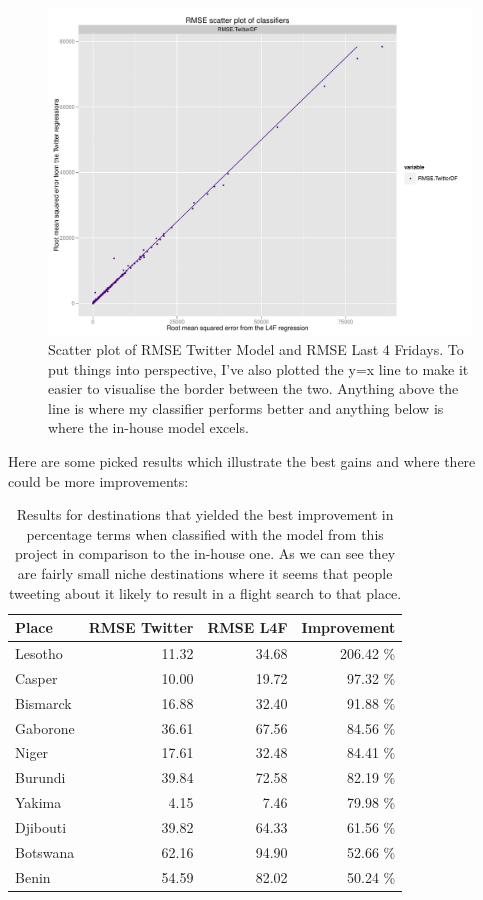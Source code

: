 \documentclass[minf,frontabs,twoside,singlespacing,parskip]{infthesis}
\begin{document}
\begin{figure}[h]
\begin{center}
\includegraphics[scale=0.5]{RMSE}
\end{center}
\caption{Scatter plot of RMSE Twitter Model and RMSE Last 4 Fridays. To put things into perspective, I've also plotted the y=x line to make it easier to visualise the border between the two. Anything above the line is where my classifier performs better and anything below is where the in-house model excels.  }
\end{figure}

Here are some picked results which illustrate the best gains and where there could be more improvements:

\begin{table}[h]
\begin{center}
\begin{tabular}{ l | r | r | r}
Place & RMSE Twitter & RMSE L4F & Improvement \\
\hline
Lesotho & 11.32 & 34.68 & 206.42 \% \\ 
Casper & 10.00 & 19.72 & 97.32 \% \\ 
Bismarck & 16.88 & 32.40 & 91.88 \% \\ 
Gaborone & 36.61 & 67.56 & 84.56 \% \\ 
Niger & 17.61 & 32.48 & 84.41 \% \\ 
Burundi & 39.84 & 72.58 & 82.19 \% \\ 
Yakima & 4.15 & 7.46 & 79.98 \% \\ 
Djibouti & 39.82 & 64.33 & 61.56 \% \\ 
Botswana & 62.16 & 94.90 & 52.66 \% \\ 
Benin & 54.59 & 82.02 & 50.24 \% \\ 
\end{tabular}
\end{center}
\caption{Results for destinations that yielded the best improvement in percentage terms when classified with the model from this project in comparison to the in-house one. As we can see they are fairly small niche destinations where it seems that people tweeting about it likely to result in a flight search to that place.}
\end{table}
\end{document}
